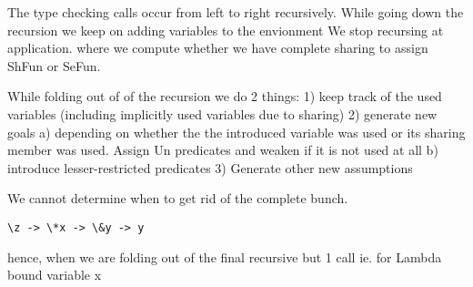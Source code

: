 
The type checking calls occur from left to right recursively.
While going down the recursion we keep on adding variables to the envionment
We stop recursing at application. where we compute whether we have complete sharing to assign ShFun or SeFun.

While folding out of of the recursion we do 2 things:
1) keep track of the used variables (including implicitly used variables due to sharing)
2) generate new goals
   a) depending on whether the the introduced variable was used
      or its sharing member was used. Assign Un predicates and weaken if it is not used at all
   b) introduce lesser-restricted predicates
3) Generate other new assumptions

We cannot determine when to get rid of the complete bunch.
\begin{verbatim}
\z -> \*x -> \&y -> y
\end{verbatim}
hence, when we are folding out of the final recursive but 1 call ie. for Lambda bound variable x



